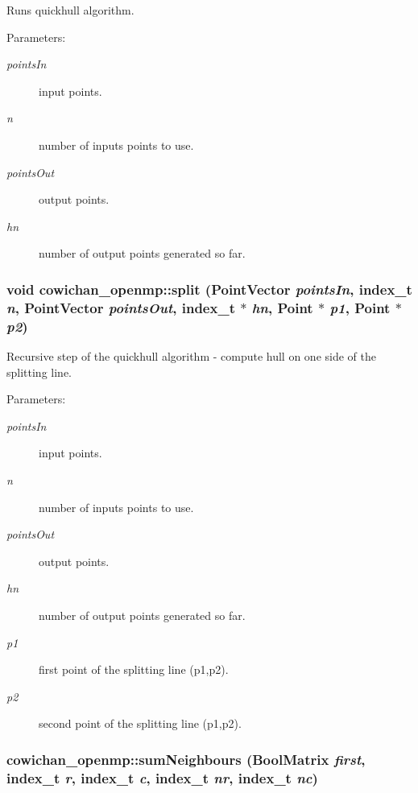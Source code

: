 Runs quickhull algorithm. \begin{Desc}
\item[Parameters:]
\begin{description}
\item[{\em pointsIn}]input points. \item[{\em n}]number of inputs points to use. \item[{\em pointsOut}]output points. \item[{\em hn}]number of output points generated so far. \end{description}
\end{Desc}
\hypertarget{namespacecowichan__openmp_d31787f1b4c9d57119160411e96f769f}{
\subsubsection[{split}]{\setlength{\rightskip}{0pt plus 5cm}void cowichan\_\-openmp::split ({\bf PointVector} {\em pointsIn}, \/  {\bf index\_\-t} {\em n}, \/  {\bf PointVector} {\em pointsOut}, \/  {\bf index\_\-t} $\ast$ {\em hn}, \/  {\bf Point} $\ast$ {\em p1}, \/  {\bf Point} $\ast$ {\em p2})}}
\label{namespacecowichan__openmp_d31787f1b4c9d57119160411e96f769f}


Recursive step of the quickhull algorithm - compute hull on one side of the splitting line. \begin{Desc}
\item[Parameters:]
\begin{description}
\item[{\em pointsIn}]input points. \item[{\em n}]number of inputs points to use. \item[{\em pointsOut}]output points. \item[{\em hn}]number of output points generated so far. \item[{\em p1}]first point of the splitting line (p1,p2). \item[{\em p2}]second point of the splitting line (p1,p2). \end{description}
\end{Desc}
\hypertarget{namespacecowichan__openmp_a4ce5b0ba78cd9480bf45e7c313f59d1}{
\subsubsection[{sumNeighbours}]{ cowichan\_\-openmp::sumNeighbours ({\bf BoolMatrix} {\em first}, \/  {\bf index\_\-t} {\em r}, \/  {\bf index\_\-t} {\em c}, \/  {\bf index\_\-t} {\em nr}, \/  {\bf index\_\-t} {\em nc})}}
\label{namespacecowichan__openmp_a4ce5b0ba78cd9480bf45e7c313f59d1}



